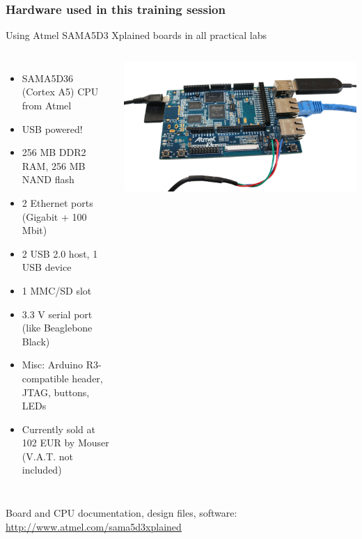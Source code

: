 \begin{frame}
\frametitle{Hardware used in this training session}
  Using Atmel SAMA5D3 Xplained boards in all practical labs
  \begin{columns}
    {\footnotesize
    \begin{itemize}
	\item SAMA5D36 (Cortex A5) CPU from Atmel
	\item USB powered!
	\item 256 MB DDR2 RAM, 256 MB NAND flash
	\item 2 Ethernet ports (Gigabit + 100 Mbit)
	\item 2 USB 2.0 host, 1 USB device
	\item 1 MMC/SD slot
	\item 3.3 V serial port (like Beaglebone Black)
	\item Misc: Arduino R3-compatible header, JTAG, buttons, LEDs
	\item Currently sold at 102 EUR by Mouser (V.A.T. not included)
    \end{itemize}
    }
    \includegraphics[width=\textwidth]{slides/xplained-board/xplained-board.png}
  \end{columns}
  \vspace{1em}
  {\small
  Board and CPU documentation, design files, software:
  \url{http://www.atmel.com/sama5d3xplained}
  }
\end{frame}
